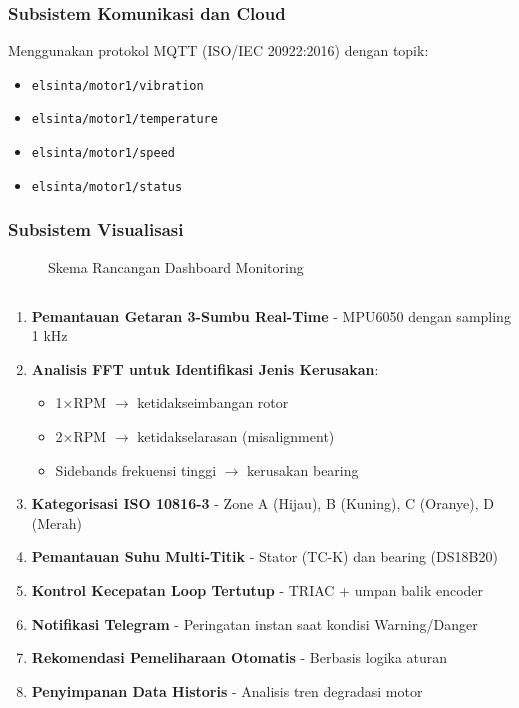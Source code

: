 \documentclass{elsinta}
\begin{document}
\subsubsection{Subsistem Komunikasi dan Cloud}

Menggunakan protokol MQTT (ISO/IEC 20922:2016) dengan topik:
\begin{itemize}
    \item \texttt{elsinta/motor1/vibration}
    \item \texttt{elsinta/motor1/temperature}
    \item \texttt{elsinta/motor1/speed}
    \item \texttt{elsinta/motor1/status}
\end{itemize}

\subsubsection{Subsistem Visualisasi}

\begin{figure}[H]
    \centering
    \caption{Skema Rancangan Dashboard Monitoring}
    \label{fig:dashboard}
\end{figure}

\subsection{\MainFeaturesTitle}

\begin{enumerate}
    \item \textbf{Pemantauan Getaran 3-Sumbu Real-Time} - MPU6050 dengan sampling 1 kHz
    \item \textbf{Analisis FFT untuk Identifikasi Jenis Kerusakan}:
    \begin{itemize}
        \item 1×RPM $\rightarrow$ ketidakseimbangan rotor
        \item 2×RPM $\rightarrow$ ketidakselarasan (misalignment)
        \item Sidebands frekuensi tinggi $\rightarrow$ kerusakan bearing
    \end{itemize}
    \item \textbf{Kategorisasi ISO 10816-3} - Zone A (Hijau), B (Kuning), C (Oranye), D (Merah)
    \item \textbf{Pemantauan Suhu Multi-Titik} - Stator (TC-K) dan bearing (DS18B20)
    \item \textbf{Kontrol Kecepatan Loop Tertutup} - TRIAC + umpan balik encoder
    \item \textbf{Notifikasi Telegram} - Peringatan instan saat kondisi Warning/Danger
    \item \textbf{Rekomendasi Pemeliharaan Otomatis} - Berbasis logika aturan
    \item \textbf{Penyimpanan Data Historis} - Analisis tren degradasi motor
\end{enumerate}
\end{document}
